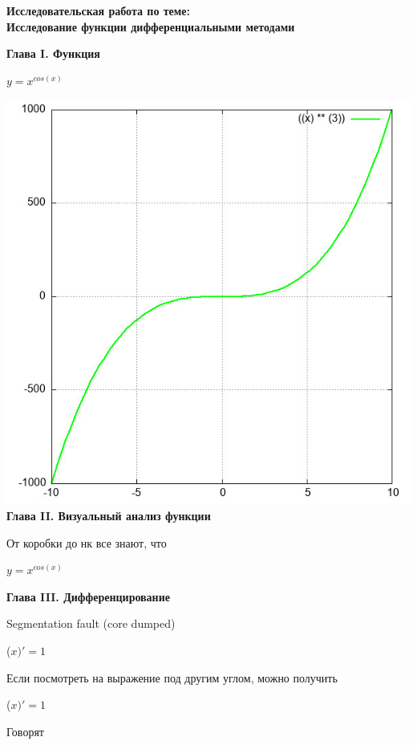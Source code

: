 \documentclass[12pt,a4paper,fleqn]{article}
\begin{document}
\begin{center}
\textbf{\LARGE{Исследовательская работа по теме:\\Исследование функции дифференциальными методами}}\end{center}\newpage\textbf{\LARGE Глава I. Функция}

\begin{center}
$y = $$x^{cos(x)}$

\end{center}
\includegraphics{GraphicDumps/plot.jpg}\newpage \textbf{\LARGE Глава II. Визуальный анализ функции}

От коробки до нк все знают, что

\begin{center}
$y = $$x^{cos(x)}$

\end{center}
\newpage \textbf{\LAGRE Глава III. Дифференцирование}

Segmentation fault (core dumped)

\begin{center}
 ($x)'
  = 1$\end{center}
Если посмотреть на выражение под другим углом, можно получить

\begin{center}
 ($x)'
  = 1$\end{center}
Говорят
\end{document}
